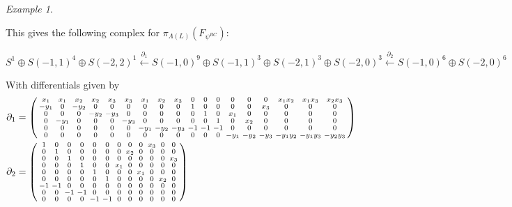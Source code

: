 \documentclass{amsart}
\theoremstyle{remark}
\newtheorem{example}[theorem]{Example}
\begin{document}
\begin{example}
\begin{figure}
  \end{figure}

  This gives the following complex for $\pi_{\Lambda(L)}(F_{\psi^{BC}})$:

  \[
  S^1\oplus S(-1,1)^4 \oplus S(-2,2)^1 \xleftarrow{\partial_1}
  S(-1,0)^9\oplus S(-1,1)^3 \oplus S(-2,1)^3 \oplus S(-2,0)^3 \xleftarrow{\partial_2}
  S(-1,0)^6\oplus S(-2,0)^6
  \]

  With differentials given by
  \begin{align*}
    \partial_1 &= 
    \begin{psmallmatrix}
      x_1 & x_1 & x_2 & x_2 & x_3 & x_3 & x_1 & x_2 & x_3 & 0 & 0 & 0 & 0   & 0   & 0   & x_1x_2 & x_1x_3 & x_2x_3 \\
      -y_1 & 0 & -y_2 & 0   & 0  & 0   & 0 &  0  & 0  & 1 & 0 & 0  &0 & 0   &     x_3 &0&0&0\\
        0 & 0   & 0   & -y_2 & -y_3 & 0   & 0   & 0 & 0 & 0 & 1 & 0   & x_1    &0& 0   &0&0&0\\
        0 & -y_1 & 0   & 0   & 0  & -y_3 & 0   & 0   & 0 & 0& 0 & 1 & 0   &   x_2  &0&0&0&0\\
        0 & 0   & 0   & 0   & 0   & 0  & -y_1 & -y_2 & -y_3  & -1 & -1 & -1  & 0   & 0   & 0   &0&0&0\\
         0& 0   & 0   & 0   & 0   & 0  & 0 & 0 & 0 & 0   & 0   & 0   & -y_1 & -y_2 & -y_3 & -y_1y_2 & -y_1y_3 & -y_2y_3
    \end{psmallmatrix}\\
    \partial_2 &= 
    \begin{psmallmatrix}
      1   & 0   & 0   & 0   & 0   & 0   & 0   & 0   & 0   & x_3 & 0   & 0\\
      0   & 1   & 0   & 0   & 0   & 0   & 0   & x_2 & 0   & 0   & 0   & 0\\
      0   & 0   & 1   & 0   & 0   & 0   & 0   & 0   & 0   & 0   & 0   & x_3 \\
      0   & 0   & 0   & 1   & 0   & 0   & x_1 & 0   & 0   & 0   & 0   & 0\\
      0   & 0   & 0   & 0   & 1   & 0   & 0   & 0   & x_1 & 0   & 0   & 0\\
      0   & 0   & 0   & 0   & 0   & 1   & 0   & 0   & 0   & 0   & x_2 & 0\\
      -1  & -1  & 0   & 0   & 0   & 0   &0&0&0&0&0&0\\
      0   & 0   & -1  & -1  & 0   & 0   &0&0&0&0&0&0\\
      0   & 0   & 0   & 0   & -1  & -1  &0&0&0&0&0&0\\

\end{psmallmatrix}
\end{align*}
\end{example}
\end{document}
